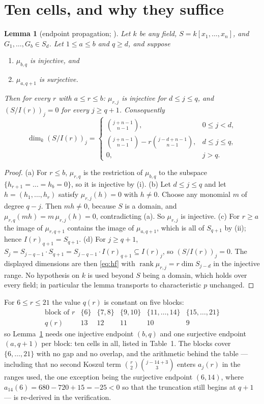 \documentclass[11pt]{amsart}
\newtheorem{lemma}[theorem]{Lemma}
\theoremstyle{remark}
\DeclareMathOperator{\rank}{rank}
\begin{document}
\section{Ten cells, and why they suffice}

\begin{lemma}[endpoint propagation; \cite{WZ}]\label{lem:endpoint}
Let $k$ be any field, $S=k[x_1,\dots,x_n]$, and $G_1,\dots,G_b\in S_d$. Let
$1\le a\le b$ and $q\ge d$, and suppose
\begin{enumerate}
\item[(i)] $\mu_{b,q}$ is injective, and
\item[(ii)] $\mu_{a,q+1}$ is surjective.
\end{enumerate}
Then for every $r$ with $a\le r\le b$: $\mu_{r,j}$ is injective for
$d\le j\le q$, and $(S/I(r))_j=0$ for every $j\ge q+1$. Consequently
\[
  \dim_k (S/I(r))_j=
  \begin{cases}
   \binom{j+n-1}{n-1}, & 0\le j<d,\\[2pt]
   \binom{j+n-1}{n-1}-r\binom{j-d+n-1}{n-1}, & d\le j\le q,\\[2pt]
   0,& j>q.
  \end{cases}
\]
\end{lemma}

\begin{proof}
(a) For $r\le b$, $\mu_{r,q}$ is the restriction of $\mu_{b,q}$ to the subspace
$\{h_{r+1}=\dots=h_b=0\}$, so it is injective by (i).
(b) Let $d\le j\le q$ and let $h=(h_1,\dots,h_r)$ satisfy $\mu_{r,j}(h)=0$ with
$h\ne0$. Choose any monomial $m$ of degree $q-j$. Then $mh\ne0$, because $S$ is
a domain, and $\mu_{r,q}(mh)=m\,\mu_{r,j}(h)=0$, contradicting (a). So
$\mu_{r,j}$ is injective.
(c) For $r\ge a$ the image of $\mu_{r,q+1}$ contains the image of
$\mu_{a,q+1}$, which is all of $S_{q+1}$ by (ii); hence $I(r)_{q+1}=S_{q+1}$.
(d) For $j\ge q+1$, $S_j=S_{j-q-1}\cdot S_{q+1}=S_{j-q-1}\cdot I(r)_{q+1}
\subseteq I(r)_j$, so $(S/I(r))_j=0$.
The displayed dimensions are then \eqref{eq:hf} with
$\rank\mu_{r,j}=r\dim S_{j-d}$ in the injective range. No hypothesis on $k$ is
used beyond $S$ being a domain, which holds over every field; in particular the
lemma transports to characteristic $p$ unchanged.
\end{proof}

For $6\le r\le21$ the value $q(r)$ is constant on five blocks:
\[
\begin{array}{c|ccccc}
 \text{block of } r & \{6\} & \{7,8\} & \{9,10\} & \{11,\dots,14\}
   & \{15,\dots,21\}\\\hline
 q(r) & 13 & 12 & 11 & 10 & 9
\end{array}
\]
so Lemma~\ref{lem:endpoint} needs one injective endpoint $(b,q)$ and one
surjective endpoint $(a,q+1)$ per block: ten cells in all, listed in Table~1.
The blocks cover $\{6,\dots,21\}$ with no gap and no overlap, and the arithmetic
behind the table --- including that no second Koszul term
$\binom{r}{2}\binom{j-14+3}{3}$ enters $a_j(r)$ in the ranges used, the one
exception being the surjective endpoint $(6,14)$, where
$a_{14}(6)=680-720+15=-25<0$ so that the truncation still begins at $q+1$ --- is
re-derived in the verification.
\end{document}
